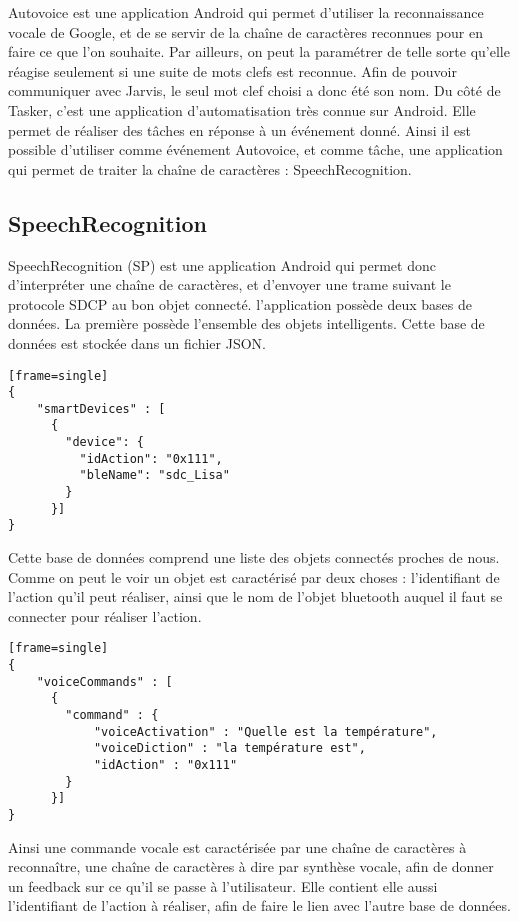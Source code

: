Autovoice est une application Android qui permet d'utiliser la reconnaissance vocale de Google, et de se 
servir de la chaîne de caractères reconnues pour en faire ce que l'on souhaite. Par ailleurs, on peut la 
paramétrer de telle sorte qu'elle réagise seulement si une suite de mots clefs est reconnue. Afin de pouvoir 
communiquer avec Jarvis, le seul mot clef choisi a donc été son nom. Du côté de Tasker, c'est une application 
d'automatisation très connue sur Android. Elle permet de réaliser des tâches en réponse à un événement donné. 
Ainsi il est possible d'utiliser comme événement Autovoice, et comme tâche, une application qui permet de 
traiter la chaîne de caractères : SpeechRecognition.

	\subsection{SpeechRecognition}
	
SpeechRecognition (SP) est une application Android qui permet donc d'interpréter une chaîne de caractères, et 
d'envoyer une trame suivant le protocole SDCP au bon objet connecté. l'application possède deux bases de 
données. La première possède l'ensemble des objets intelligents. Cette base de données est stockée dans un 
fichier JSON.

\begin{lstlisting}[caption=Base de données des objets intelligents][frame=single]
{
    "smartDevices" : [
      {
        "device": {
          "idAction": "0x111",
          "bleName": "sdc_Lisa"
        }
      }]
}
\end{lstlisting}

Cette base de données comprend une liste des objets connectés proches de nous. Comme on peut le voir un objet 
est caractérisé par deux choses : l'identifiant de l'action qu'il peut réaliser, ainsi que le nom de l'objet 
bluetooth auquel il faut se connecter pour réaliser l'action.

\begin{lstlisting}[caption=Base de données des commandes vocales][frame=single]
{
    "voiceCommands" : [
      {
        "command" : {
            "voiceActivation" : "Quelle est la température",
            "voiceDiction" : "la température est",
            "idAction" : "0x111"
        }
      }]
}
\end{lstlisting}

Ainsi une commande vocale est caractérisée par une chaîne de caractères à reconnaître, une chaîne de 
caractères à dire par synthèse vocale, afin de donner un feedback sur ce qu'il se passe à l'utilisateur. Elle 
contient elle aussi l'identifiant de l'action à réaliser, afin de faire le lien avec l'autre base de données.

